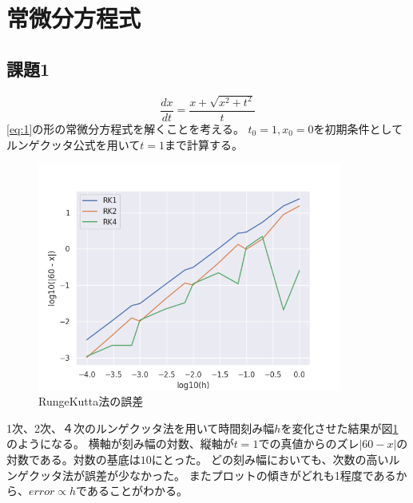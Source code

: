 \documentclass{jsarticle}
\date{\today}
\author{山田龍}
\title{}
\begin{document}
\maketitle
\section{常微分方程式}
\subsection{課題1}
\begin{equation}
    \frac{dx}{dt} = \frac{x + \sqrt{x^2 + t^2}}{t}
\end{equation}\label{eq:1}
\eqref{eq:1}の形の常微分方程式を解くことを考える。
$t_0=1,x_0 = 0$を初期条件としてルンゲクッタ公式を用いて$t=1$まで計算する。

\begin{figure}[htbp]
    \includegraphics[clip,width=10.0cm]{./runge_kutta_error.png}
    \caption{RungeKutta法の誤差}
    \label{fig:1}
\end{figure}
1次、2次、４次のルンゲクッタ法を用いて時間刻み幅$h$を変化させた結果が図\ref{fig:1}のようになる。
横軸が刻み幅の対数、縦軸が$t=1$での真値からのズレ$|60 - x|$の対数である。対数の基底は$10$にとった。
どの刻み幅においても、次数の高いルンゲクッタ法が誤差が少なかった。
またプロットの傾きがどれも1程度であるから、$error \propto h$であることがわかる。
\end{document}
